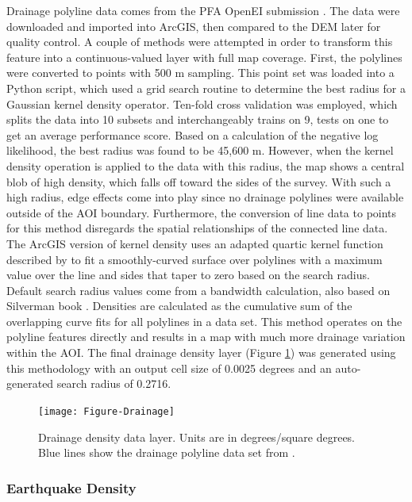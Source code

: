 Drainage polyline data comes from the \citep{bielicki_hydrogeolgic_2015} PFA OpenEI submission \citep{kelley_geothermal_2015}. The data were downloaded and imported into ArcGIS, then compared to the DEM later for quality control. A couple of methods were attempted in order to transform this feature into a continuous-valued layer with full map coverage. First, the polylines were converted to points with 500 m sampling. This point set was loaded into a Python script, which used a grid search routine to determine the best radius for a Gaussian kernel density operator. Ten-fold cross validation was employed, which splits the data into 10 subsets and interchangeably trains on 9, tests on one to get an average performance score. Based on a calculation of the negative log likelihood, the best radius was found to be 45,600 m. However, when the kernel density operation is applied to the data with this radius, the map shows a central blob of high density, which falls off toward the sides of the survey. With such a high radius, edge effects come into play since no drainage polylines were available outside of the AOI boundary. Furthermore, the conversion of line data to points for this method disregards the spatial relationships of the connected line data. The ArcGIS version of kernel density uses an adapted quartic kernel function described by \citep{silverman_density_2018} to fit a smoothly-curved surface over polylines with a maximum value over the line and sides that taper to zero based on the search radius. Default search radius values come from a bandwidth calculation, also based on Silverman book \citep{esri_how_2021,silverman_density_2018}. Densities are calculated as the cumulative sum of the overlapping curve fits for all polylines in a data set. This method operates on the polyline features directly and results in a map with much more drainage variation within the AOI. The final drainage density layer (Figure \ref{fig:feat_drainage}) was generated using this methodology with an output cell size of 0.0025 degrees and an auto-generated search radius of 0.2716.

\begin{figure}[!htp]
\centering
\texttt{[image: Figure-Drainage]}
\caption[Drainage density data layer]{Drainage density data layer. Units are in degrees/square degrees. Blue lines show the drainage polyline data set from \protect\citep{bielicki_hydrogeolgic_2015}.}
\label{fig:feat_drainage}
\end{figure}

\subsubsection{Earthquake Density}

